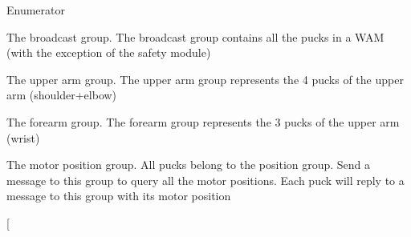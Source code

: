 \begin{Desc}
\item[Enumerator]\par
\begin{description}
\item[{\em 
\hypertarget{classosa_group_a642da327f9e3c40d46293432b949f199ae9534ab59a1ea39b9cee0501a8cd004c}{B\-R\-O\-A\-D\-C\-A\-S\-T}\label{classosa_group_a642da327f9e3c40d46293432b949f199ae9534ab59a1ea39b9cee0501a8cd004c}
}]The broadcast group. The broadcast group contains all the pucks in a W\-A\-M (with the exception of the safety module) \item[{\em 
\hypertarget{classosa_group_a642da327f9e3c40d46293432b949f199a20d3ec176caaf6065d5e80a30b3a2d65}{U\-P\-P\-E\-R\-A\-R\-M}\label{classosa_group_a642da327f9e3c40d46293432b949f199a20d3ec176caaf6065d5e80a30b3a2d65}
}]The upper arm group. The upper arm group represents the 4 pucks of the upper arm (shoulder+elbow) \item[{\em 
\hypertarget{classosa_group_a642da327f9e3c40d46293432b949f199a18cea4e0d67419684d28db8281ba6877}{F\-O\-R\-E\-A\-R\-M}\label{classosa_group_a642da327f9e3c40d46293432b949f199a18cea4e0d67419684d28db8281ba6877}
}]The forearm group. The forearm group represents the 3 pucks of the upper arm (wrist) \item[{\em 
\hypertarget{classosa_group_a642da327f9e3c40d46293432b949f199a99ec87c699a923e3bdd6f4e4b230e22b}{P\-O\-S\-I\-T\-I\-O\-N}\label{classosa_group_a642da327f9e3c40d46293432b949f199a99ec87c699a923e3bdd6f4e4b230e22b}
}]The motor position group. All pucks belong to the position group. Send a message to this group to query all the motor positions. Each puck will reply to a message to this group with its motor position \item[{\em 
}
\end{description}
\end{Desc}
